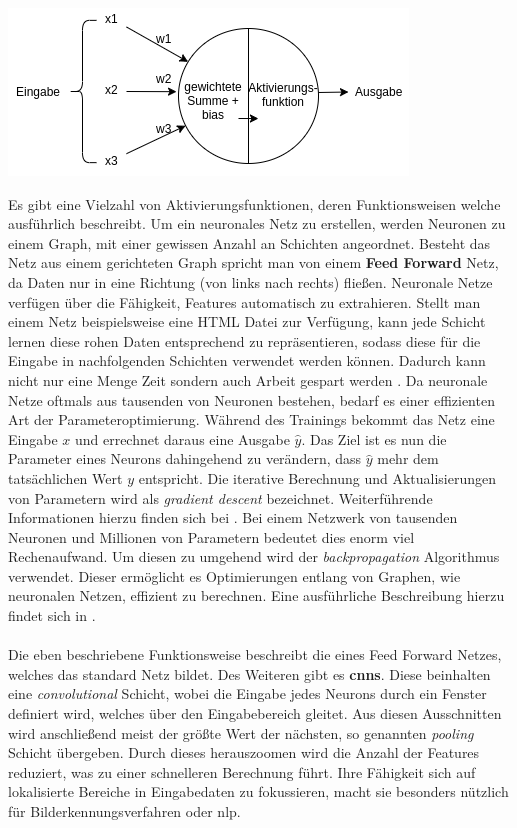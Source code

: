\documentclass[
    12pt, %
    DIV10,
    ngerman, %
    a4paper, %
    oneside, %
    titlepage, %
    parskip=half, %
    headings=normal, %
    listof=totoc, %
    bibliography=totoc, %
    index=totoc, %
    captions=tableheading, %
    final %
]{scrreprt}
\begin{document}
\begin{center}
\includegraphics[scale=0.6]{img/neuron.png}
\label{fig:neuron}
\end{center}
Es gibt eine Vielzahl von Aktivierungsfunktionen, deren Funktionsweisen welche \textcite{JoshuaSaxe2018} ausführlich beschreibt. Um ein neuronales Netz zu erstellen, werden Neuronen zu einem Graph, mit einer gewissen Anzahl an Schichten angeordnet. Besteht das Netz aus einem gerichteten Graph spricht man von einem \textbf{Feed Forward} Netz, da Daten nur in eine Richtung (von links nach rechts) flie{\ss}en. Neuronale Netze verfügen über die Fähigkeit, Features automatisch zu extrahieren. Stellt man einem Netz beispielsweise eine HTML Datei zur Verfügung, kann jede Schicht lernen diese rohen Daten entsprechend zu repräsentieren, sodass diese für die Eingabe in nachfolgenden Schichten verwendet werden können. Dadurch kann nicht nur eine Menge Zeit sondern auch Arbeit gespart werden \parencite{JoshuaSaxe2018}. Da neuronale Netze oftmals aus tausenden von Neuronen bestehen, bedarf es einer effizienten Art der Parameteroptimierung. Während des Trainings bekommt das Netz eine Eingabe $x$ und errechnet daraus eine Ausgabe $\hat{y}$. Das Ziel ist es nun die Parameter eines Neurons dahingehend zu verändern, dass $\hat{y}$ mehr dem tatsächlichen Wert $y$ entspricht. Die iterative Berechnung und Aktualisierungen von Parametern wird als \emph{gradient descent} bezeichnet. Weiterführende Informationen hierzu finden sich bei \textcite{bonaccorso2018python}. Bei einem Netzwerk von tausenden Neuronen und Millionen von Parametern bedeutet dies enorm viel Rechenaufwand. Um diesen zu umgehend wird der \emph{backpropagation} Algorithmus verwendet. Dieser ermöglicht es Optimierungen entlang von Graphen, wie neuronalen Netzen, effizient zu berechnen. Eine ausführliche Beschreibung hierzu findet sich in \textcite{krohn2019deep}.\\\\
Die eben beschriebene Funktionsweise beschreibt die eines Feed Forward Netzes, welches das standard Netz bildet. Des Weiteren gibt es \textbf{\ac{cnns}}. Diese beinhalten eine \emph{convolutional} Schicht, wobei die Eingabe jedes Neurons durch ein Fenster definiert wird, welches über den Eingabebereich gleitet. Aus diesen Ausschnitten wird anschlie{\ss}end meist der grö{\ss}te Wert der nächsten, so genannten \emph{pooling} Schicht übergeben. Durch dieses herauszoomen wird die Anzahl der Features reduziert, was zu einer schnelleren Berechnung führt. Ihre Fähigkeit sich auf lokalisierte Bereiche in Eingabedaten zu fokussieren, macht sie besonders nützlich für Bilderkennungsverfahren oder \ac{nlp}.\\\\
\end{document}
